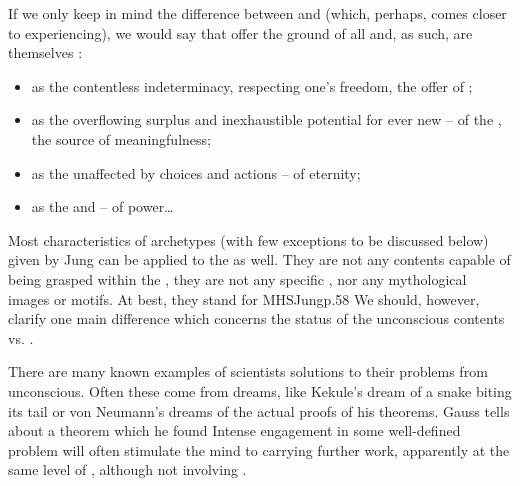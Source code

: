 \pa If we only keep in mind the difference between  and
 (which, perhaps, comes closer to experiencing), we would say that
 offer the ground of all  and, as such, are
themselves :
\begin{itemize}\MyLPar
\item   
as the contentless indeterminacy, respecting one's freedom, the 
offer  of ;
\item   
as the overflowing surplus and inexhaustible potential for ever new
 --  of the , the source of meaningfulness; 
\item   
as the  unaffected by 
choices and actions --  of eternity; 
\item   
as the  and  -- 
 of  power\ldots
\end{itemize}


\label{sub:notunconscious}\label{se:JungPlotinus}
%
Most characteristics of archetypes (with few exceptions to be discussed below)
given by Jung can be applied to the  as well.  They are not any
 contents capable of being grasped within the \hoa, they are not any
specific , nor any mythological images or motifs. At best,
they stand for \citet{a tendency to form such representations of a motif --
  representations that can vary a great deal in detail without losing their
  pattern.}{MHSJung}{p.58}  We should, however, clarify one main difference which
concerns the status of the unconscious contents vs. .

\pa There are many known examples of scientists 
solutions to their problems from unconscious.  Often these come from
dreams, like Kekule's dream of a snake biting its tail or von
Neumann's dreams of the actual proofs of his theorems.  Gauss tells about
a theorem which he found  Intense
engagement in some well-defined problem will often stimulate the mind
to carrying further work, apparently at the same level of 
, although not involving .

